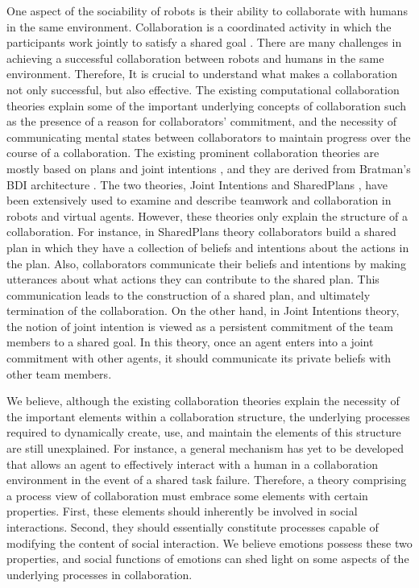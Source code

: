 One aspect of the sociability of robots is their ability to collaborate with
humans in the same environment. Collaboration is a coordinated activity in which
the participants work jointly to satisfy a shared goal
\cite{grosz:plans-discourse}. There are many challenges in achieving a
successful collaboration between robots and humans in the same environment.
Therefore, It is crucial to understand what makes a collaboration not only
successful, but also effective. The existing computational collaboration
theories explain some of the important underlying concepts of collaboration such
as the presence of a reason for collaborators' commitment, and the necessity
of communicating mental states between collaborators to maintain progress over
the course of a collaboration. The existing prominent collaboration theories are
mostly based on plans and joint intentions \cite{cohen:teamwork}
\cite{grosz:plans-discourse} \cite{Litman:discourse-commonsense}, and they are
derived from Bratman's BDI architecture \cite{bratman:intentions-plans}. The two
theories, Joint Intentions \cite{cohen:teamwork} and SharedPlans
\cite{grosz:planning-acting,grosz:collaboration,grosz:plans-discourse}, have
been extensively used to examine and describe teamwork and collaboration in
robots and virtual agents. However, these theories only explain the structure of
a collaboration. For instance, in SharedPlans theory collaborators build a
shared plan in which they have a collection of beliefs and intentions about the
actions in the plan. Also, collaborators communicate their beliefs and
intentions by making utterances about what actions they can contribute to the
shared plan. This communication leads to the construction of a shared plan, and
ultimately termination of the collaboration. On the other hand, in Joint
Intentions theory, the notion of joint intention is viewed as a persistent
commitment of the team members to a shared goal. In this theory, once an agent
enters into a joint commitment with other agents, it should communicate its
private beliefs with other team members.

We believe, although the existing collaboration theories explain the necessity
of the important elements within a collaboration structure, the underlying
processes required to dynamically create, use, and maintain the elements of this
structure are still unexplained. For instance, a general mechanism has yet to be
developed that allows an agent to effectively interact with a human in a
collaboration environment in the event of a shared task failure. Therefore, a
theory comprising a process view of collaboration must embrace some elements
with certain properties. First, these elements should inherently be involved in
social interactions. Second, they should essentially constitute processes
capable of modifying the content of social interaction. We believe emotions
possess these two properties, and social functions of emotions can shed light on
some aspects of the underlying processes in collaboration.

